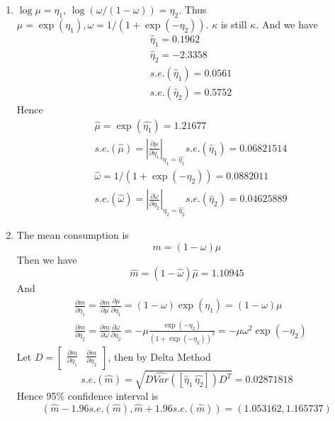 \documentclass{article}
\begin{document}
\begin{enumerate}[leftmargin = 0 em, label = \arabic*., font = \bfseries]
\begin{enumerate}
		  \item 
		  $\log \mu = \eta_1,\, \log(\omega /(1 - \omega)) = \eta_2$. Thus $\mu = \exp(\eta_1), \omega = 1/(1 +\exp(-\eta_2))$. $\kappa$ is still $\kappa$. And we have
		  \begin{align*}
		   &\hat{\eta}_1 = 0.1962\\
		   & \hat{\eta}_2 = -2.3358\\
		   &s.e.(\hat{\eta}_1) = 0.0561\\
		   & s.e.(\hat{\eta}_2) = 0.5752
		   \end{align*}
		   Hence 
		   \begin{align*}
		   &\hat{\mu} = \exp(\hat{\eta_1}) = 1.21677\\
		   &s.e.(\hat{\mu}) = \left|\frac{\partial \mu}{\partial \eta_1}\right|_{\eta_1 = \hat{\eta_1}} s.e.(\hat{\eta}_1) = 0.06821514\\
		   &\hat{\omega} = 1/(1+\exp(-\eta_2)) = 0.0882011 \\
		   &s.e.(\hat{\omega}) = \left|\frac{\partial \omega}{\partial \eta_2}\right|_{\eta_2 = \hat{\eta_2}} s.e.(\hat{\eta}_2) = 0.04625889 
		   \end{align*}


		   \item 
		   The mean consumption is
		   \[m = (1 - \omega) \mu\]
		   Then we have
		   \[\hat{m} = (1 - \hat{\omega}) \hat{\mu} = 1.10945 \]
		   And
		   \begin{align*}
		    &\frac{\partial m}{\partial \eta_1} = \frac{\partial m}{\partial \mu} \frac{\partial \mu}{\partial \eta_1} = (1 - \omega) \exp(\eta_1) = (1 - \omega) \mu\\
		    & \frac{\partial m}{\partial \eta_2} = \frac{\partial m}{\partial \omega} \frac{\partial \omega}{\partial \eta_2} = -\mu \frac{\exp(-\eta_2)}{(1 + \exp(-\eta_2))^2} = -\mu \omega^2 \exp(-\eta_2)
		    \end{align*}
		    Let $D = \begin{bmatrix}
		    	\frac{\partial m}{\partial \eta_1}&\frac{\partial m}{\partial \eta_2}
		    \end{bmatrix}$, then by Delta Method
		    \[s.e.(\hat{m}) = \sqrt{D\widehat{Var}([\hat{\eta}_1\, \hat{\eta_2}])D^T} = 0.02871818\]
		    Hence 95\% confidence interval is
		    \[(\hat{m} - 1.96 s.e.(\hat{m}), \hat{m} + 1.96 s.e. (\hat{m})) = (1.053162, 1.165737)\]


\end{enumerate}
\end{enumerate}
\end{document}
